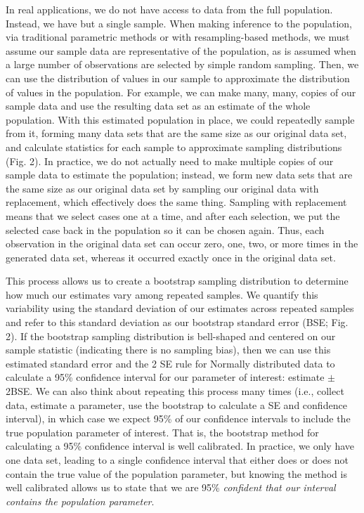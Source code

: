 \documentclass[fleqn,10pt]{wlpeerj} %
\begin{document}
In real applications, we do not have access to data from the full population. Instead, we have but a single sample. When making inference to the population, via traditional parametric methods or with resampling-based methods, we must assume our sample data are representative of the population, as is assumed when a large number of observations are selected by simple random sampling. Then, we can use the distribution of values in our sample to approximate the distribution of values in the population. For example, we can make many, many, copies of our sample data and use the resulting data set as an estimate of the whole population. With this estimated population in place, we could repeatedly sample from it, forming many data sets that are the same size as our original data set, and calculate statistics for each sample to approximate sampling distributions (Fig. 2). In practice, we do not actually need to make multiple copies of our sample data to estimate the population; instead, we form new data sets that are the same size as our original data set by sampling our original data with replacement, which effectively does the same thing. Sampling with replacement means that we select cases one at a time, and after each selection, we put the selected case back in the population so it can be chosen again. Thus, each observation in the original data set can occur zero, one, two, or more times in the generated data set, whereas it occurred exactly once in the original data set.

This process allows us to create a bootstrap sampling distribution to determine how much our estimates vary among repeated samples. We quantify this variability using the standard deviation of our estimates across repeated samples and refer to this standard deviation as our bootstrap standard error (BSE; Fig. 2). If the bootstrap sampling distribution is bell-shaped and centered on our sample statistic (indicating there is no sampling bias), then we can use this estimated standard error and the 2 SE rule for Normally distributed data to calculate a 95\% confidence interval for our parameter of interest: estimate \(\pm\) 2BSE. We can also think about repeating this process many times (i.e., collect data, estimate a parameter, use the bootstrap to calculate a SE and confidence interval), in which case we expect 95\% of our confidence intervals to include the true population parameter of interest. That is, the bootstrap method for calculating a 95\% confidence interval is well calibrated. In practice, we only have one data set, leading to a single confidence interval that either does or does not contain the true value of the population parameter, but knowing the method is well calibrated allows us to state that we are 95\% \emph{confident that our interval contains the population parameter}.
\end{document}

